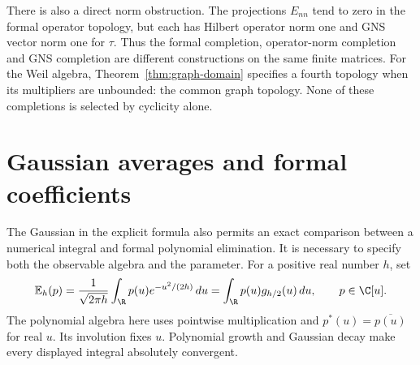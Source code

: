 There is also a direct norm obstruction.
The projections $E_{nn}$ tend to zero in the formal operator topology,
but each has Hilbert operator norm one and GNS vector norm one for
$\tau$.  Thus the formal completion, operator-norm completion and
GNS completion are different constructions on the same finite matrices.
For the Weil algebra, Theorem~\ref{thm:graph-domain} specifies a fourth
topology when its multipliers are unbounded: the common graph topology.
None of these completions is selected by cyclicity alone.

\section{Gaussian averages and formal coefficients}
\label{sec:weil-gaussian-coefficients}

The Gaussian in the explicit formula also permits an exact comparison
between a numerical integral and formal polynomial elimination.
It is necessary to specify both the observable algebra and the parameter.
For a positive real number $h$, set
\[
 \mathbb E_h(p)=\frac1{\sqrt{2\pi h}}
       \int_{\R}p(u)e^{-u^2/(2h)}\,du
       =\int_{\R}p(u)g_{h/2}(u)\,du,
 \qquad p\in\C[u].
\]
The polynomial algebra here uses pointwise multiplication and
$p^*(u)=\overline{p(u)}$ for real $u$.
Its involution fixes $u$.  Polynomial growth and Gaussian decay make
every displayed integral absolutely convergent.


